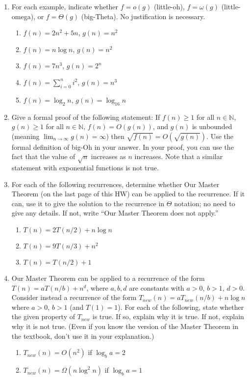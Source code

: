 \documentclass{article}
\begin{document}
\begin{enumerate}
    \item For each example, indicate whether $f = o(g)$ (little-oh), $f = \omega(g)$ (little-omega), or $f = \Theta(g)$ (big-Theta). No justification is necessary.
    \begin{enumerate}
        \item $f(n) = 2n^2 + 5n$, $g(n) = n^2$
        \item $f(n) = n \log n$, $g(n) = n^2$
        \item $f(n) = 7n^3$, $g(n) = 2^n$
        \item $f(n) = \sum_{i=0}^n i^2$, $g(n) = n^3$
        \item $f(n) = \log_2 n$, $g(n) = \log_{16} n$
    \end{enumerate}

    \item Give a formal proof of the following statement: If $f(n) \ge 1$ for all $n \in \mathbb{N}$, $g(n) \ge 1$ for all $n \in \mathbb{N}$, $f(n) = O(g(n))$, and $g(n)$ is unbounded (meaning $\lim_{n \to \infty} g(n) = \infty$) then $\sqrt{f(n)} = O(\sqrt{g(n)})$. Use the formal definition of big-Oh in your answer. In your proof, you can use the fact that the value of $\sqrt{n}$ increases as $n$ increases.  Note that a similar statement with exponential functions is not true.

    \item For each of the following recurrences, determine whether Our Master Theorem (on the last page of this HW) can be applied to the recurrence. If it can, use it to give the solution to the recurrence in $\Theta$ notation; no need to give any details. If not, write “Our Master Theorem does not apply.”
    \begin{enumerate}
        \item $T(n) = 2T(n/2) + n \log n$
        \item $T(n) = 9T(n/3) + n^2$
        \item $T(n) = T(n/2) + 1$
    \end{enumerate}

    \item Our Master Theorem can be applied to a recurrence of the form $T(n) = aT(n/b) + n^d$, where $a, b, d$ are constants with $a > 0$, $b > 1$, $d > 0$. Consider instead a recurrence of the form $T_{new}(n) = aT_{new}(n/b) + n \log n$ where $a > 0$, $b > 1$ (and $T(1) = 1$). For each of the following, state whether the given property of $T_{new}$ is true. If so, explain why it is true. If not, explain why it is not true. (Even if you know the version of the Master Theorem in the textbook, don’t use it in your explanation.)
    \begin{enumerate}
        \item $T_{new}(n) = O(n^2)$ if $\log_b a = 2$
        \item $T_{new}(n) = \Omega(n \log^2 n)$ if $\log_b a = 1$
    \end{enumerate}


\end{enumerate}
\end{document}

